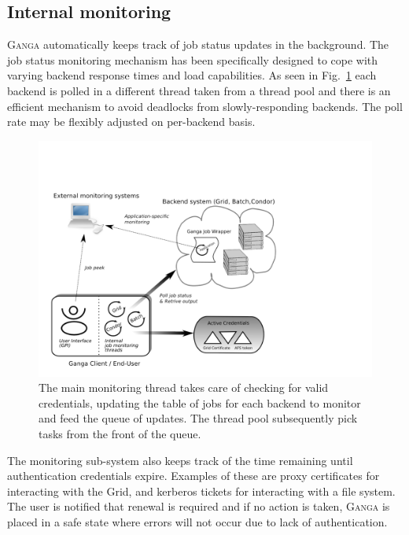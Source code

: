 \documentclass{elsart}
\def\ganga {\textsc{Ganga}\xspace}
\def\grid {Grid\xspace}
\begin{document}
\subsection{Internal monitoring}
\label{sec:GangaMonitoring}
\ganga automatically keeps track of job status updates in the background.  The
job status monitoring mechanism has been specifically designed to cope with
varying backend response times and load capabilities. As seen in
Fig.~\ref{fig:job_status_monitoring_mechanism} each backend is polled in a
different thread taken from a thread pool and there is an efficient mechanism
to avoid deadlocks from slowly-responding backends. The poll rate may be
flexibly adjusted on per-backend basis.
\begin{figure}[htbp]
  \begin{center}
    \includegraphics[width=1 \textwidth]{monitoring.pdf}
    \caption{The main monitoring thread takes care of checking for valid
      credentials, updating the table of jobs for each backend to monitor and
      feed the queue of updates. The thread pool subsequently pick tasks from
      the front of the queue.}
    \label{fig:job_status_monitoring_mechanism}
  \end{center}
\end{figure}

The monitoring sub-system also keeps track of the time remaining until
authentication credentials expire. Examples of these are proxy certificates
for interacting with the \grid, and kerberos tickets for interacting with a
file system. The user is notified that renewal is required and if no action is
taken, \ganga is placed in a safe state where errors will not occur due to
lack of authentication.
\end{document}
